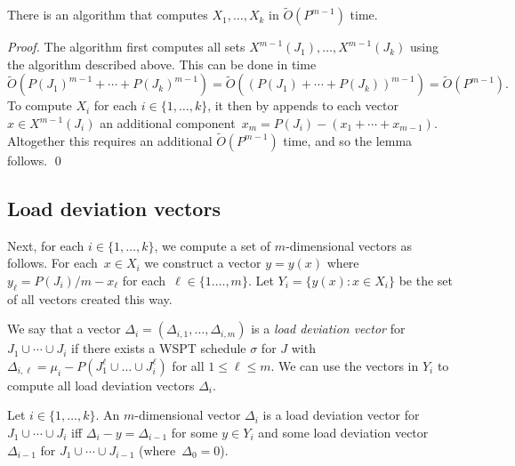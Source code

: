 \documentclass[11pt]{llncs}
\begin{document}
\begin{lemma}
\label{lem:LoadDistVectors}%
There is an algorithm that computes $X_1,\ldots,X_k$ in $\tilde{O}(P^{m-1})$ time.
\end{lemma}
\begin{proof}
The algorithm first computes all sets $X^{m-1}(J_1),\ldots,X^{m-1}(J_k)$ using the algorithm described above. This can be done in time
$$
\widetilde{O}(P(J_1)^{m-1} + \cdots + P(J_k)^{m-1}) = \widetilde{O}((P(J_1) + \cdots + P(J_k))^{m-1}) = \tilde{O}(P^{m-1}).
$$
To compute $X_i$ for each $i \in \{1,\ldots,k\}$, it then by appends to each vector $x \in X^{m-1}(J_i)$ an additional component~$x_m = P(J_i)-(x_1+\cdots +x_{m-1})$. Altogether this requires an additional $\tilde{O}(P^{m-1})$ time, and so the lemma follows. \qed
\end{proof}



\subsection{Load deviation vectors}

Next, for each $i \in \{1,\ldots,k\}$, we compute a set of $m$-dimensional vectors as follows. For each~$x\in X_i$ we construct a vector $y=y(x)$ where $y_\ell = P(J_i)/m - x_\ell$ for each~$\ell \in \{1.\ldots,m\}$. Let $Y_i=\{y(x): x \in X_i\}$ be the set of all vectors created this way.

We say that a vector $\Delta_i = (\Delta_{i,1},\ldots,\Delta_{i,m})$ is a \emph{load deviation vector} for $J_1 \cup \cdots \cup J_i$ if there exists a WSPT schedule $\sigma$ for $J$ with $\Delta_{i,\ell} = \mu_i-P(J_1^\ell \cup \dots \cup J_i^\ell)$ for all $1 \leq \ell \leq m$. We can use the vectors in $Y_i$ to compute all load deviation vectors $\Delta_i$.

\begin{lemma}
\label{lem:LoadDevVectors}%
Let $i \in \{1,\ldots,k\}$. An $m$-dimensional vector $\Delta_i$ is a load deviation vector for~$J_1 \cup \cdots \cup J_i$ iff $\Delta_i - y= \Delta_{i-1}$ for some $y \in Y_i$ and some load deviation vector~$\Delta_{i-1}$ for $J_1 \cup \cdots \cup J_{i-1}$ (where~$\Delta_0 = 0$). 
\end{lemma}
\end{document}
